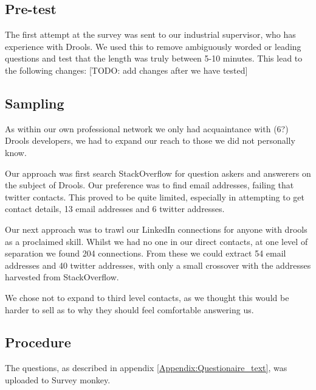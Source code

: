 \subsection{Pre-test}
The first attempt at the survey was sent to our industrial supervisor, who has experience with Drools.
We used this to remove ambiguously worded or leading questions and test that the length was truly between 5-10 minutes.
This lead to the following changes:
[TODO: add changes after we have tested]


\subsection{Sampling}
As within our own professional network we only had acquaintance with (6?) Drools developers, we had to expand our reach to those we did not personally know.

Our approach was first search StackOverflow for question askers and answerers on the subject of Drools.
Our preference was to find email addresses, failing that twitter contacts.
This proved to be quite limited, especially in attempting to get contact details, 13 email addresses and 6 twitter addresses.

Our next approach was to trawl our LinkedIn connections for anyone with drools as a proclaimed skill.
Whilst we had no one in our direct contacts, at one level of separation we found 204 connections.
From these we could extract 54 email addresses and 40 twitter addresses, with only a small crossover with the addresses harvested from StackOverflow.

We chose not to expand to third level contacts, as we thought this would be harder to sell as to why they should feel comfortable answering us.

\subsection{Procedure}

The questions, as described in appendix \ref{Appendix:Questionaire_text}, was uploaded to Survey monkey.


